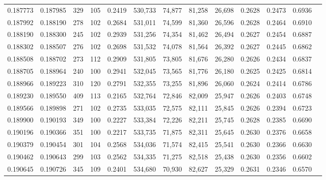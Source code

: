 \begin{tabular}{rrrrrrrrrrrrr}
0.187773 & 0.187985 &   329 & 105 &                                     0.2419 & 530,733 &  74,877 &  81,258 &  26,698 & 0.2628 & 0.2473 & 0.6936 \\
0.187992 & 0.188190 &   278 & 102 &                                     0.2684 & 531,011 &  74,599 &  81,360 &  26,596 & 0.2628 & 0.2464 & 0.6910 \\
0.188190 & 0.188300 &   245 & 102 &                                     0.2939 & 531,256 &  74,354 &  81,462 &  26,494 & 0.2627 & 0.2454 & 0.6887 \\
0.188302 & 0.188507 &   276 & 102 &                                     0.2698 & 531,532 &  74,078 &  81,564 &  26,392 & 0.2627 & 0.2445 & 0.6862 \\
0.188508 & 0.188702 &   273 & 112 &                                     0.2909 & 531,805 &  73,805 &  81,676 &  26,280 & 0.2626 & 0.2434 & 0.6837 \\
0.188705 & 0.188964 &   240 & 100 &                                     0.2941 & 532,045 &  73,565 &  81,776 &  26,180 & 0.2625 & 0.2425 & 0.6814 \\
0.188966 & 0.189223 &   310 & 120 &                                     0.2791 & 532,355 &  73,255 &  81,896 &  26,060 & 0.2624 & 0.2414 & 0.6786 \\
0.189230 & 0.189550 &   409 & 113 &                                     0.2165 & 532,764 &  72,846 &  82,009 &  25,947 & 0.2626 & 0.2403 & 0.6748 \\
0.189566 & 0.189898 &   271 & 102 &                                     0.2735 & 533,035 &  72,575 &  82,111 &  25,845 & 0.2626 & 0.2394 & 0.6723 \\
0.189900 & 0.190193 &   349 & 100 &                                     0.2227 & 533,384 &  72,226 &  82,211 &  25,745 & 0.2628 & 0.2385 & 0.6690 \\
0.190196 & 0.190366 &   351 & 100 &                                     0.2217 & 533,735 &  71,875 &  82,311 &  25,645 & 0.2630 & 0.2376 & 0.6658 \\
0.190379 & 0.190454 &   301 & 104 &                                     0.2568 & 534,036 &  71,574 &  82,415 &  25,541 & 0.2630 & 0.2366 & 0.6630 \\
0.190462 & 0.190643 &   299 & 103 &                                     0.2562 & 534,335 &  71,275 &  82,518 &  25,438 & 0.2630 & 0.2356 & 0.6602 \\
0.190645 & 0.190726 &   345 & 109 &                                     0.2401 & 534,680 &  70,930 &  82,627 &  25,329 & 0.2631 & 0.2346 & 0.6570 \\

\end{tabular}
